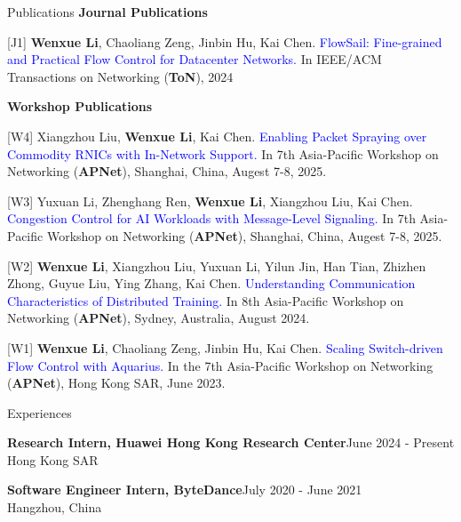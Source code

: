 \documentclass{resume} %
\newcommand{\blue}[1]{\textcolor{blue}{#1}}
\begin{document}
\begin{rSection}{Publications}
\textbf{Journal Publications}

[J1] \textbf{Wenxue Li}, Chaoliang Zeng, Jinbin Hu, Kai Chen. \blue{FlowSail: Fine-grained and Practical Flow Control for Datacenter Networks.} In IEEE/ACM Transactions on Networking (\textbf{ToN}), 2024

\textbf{Workshop Publications}

[W4] Xiangzhou Liu, \textbf{Wenxue Li}, Kai Chen. \blue{Enabling Packet Spraying over Commodity RNICs with In-Network Support.} In 7th Asia-Pacific Workshop on Networking (\textbf{APNet}), Shanghai, China, Augest 7-8, 2025.

[W3] Yuxuan Li, Zhenghang Ren, \textbf{Wenxue Li}, Xiangzhou Liu, Kai Chen. \blue{Congestion Control for AI Workloads with Message-Level Signaling.} In 7th Asia-Pacific Workshop on Networking (\textbf{APNet}), Shanghai, China, Augest 7-8, 2025.

[W2] \textbf{Wenxue Li}, Xiangzhou Liu, Yuxuan Li, Yilun Jin, Han Tian, Zhizhen Zhong, Guyue Liu, Ying Zhang, Kai Chen. \blue{Understanding Communication Characteristics of Distributed Training.} In 8th Asia-Pacific Workshop on Networking (\textbf{APNet}), Sydney, Australia, August 2024.

[W1] \textbf{Wenxue Li}, Chaoliang Zeng, Jinbin Hu, Kai Chen. \blue{Scaling Switch-driven Flow Control with Aquarius.} In the 7th Asia-Pacific Workshop on Networking (\textbf{APNet}), Hong Kong SAR, June 2023.

\end{rSection}
\begin{rSection}{Experiences}

\textbf{Research Intern, Huawei Hong Kong Research Center}{\hfill June 2024 - Present}\\
Hong Kong SAR

\textbf{Software Engineer Intern, ByteDance}{\hfill July 2020 - June 2021}\\
Hangzhou, China
	

\end{rSection}
\end{document}
